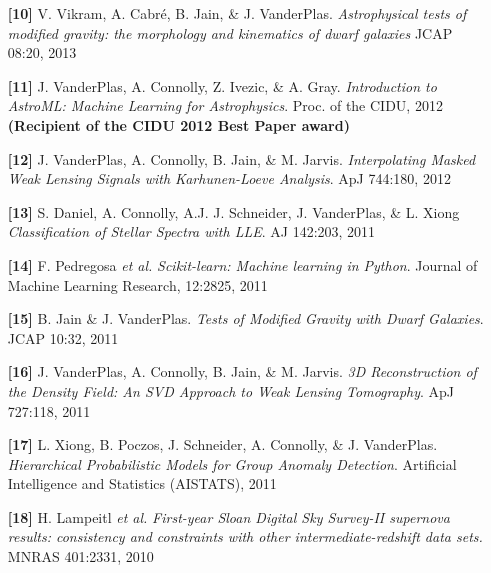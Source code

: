 \documentclass{article} %
\def\bf{\bfseries}
\def\sl{\slshape}
\begin{document}
{\begin{itemize}[leftmargin=0ex, itemsep=0ex, parsep=.5ex, labelindent=-4ex]
    \item[{\bf \textcolor{myblue}{[10]}}]
      V. Vikram, A. Cabr\'{e}, B. Jain, \& J. VanderPlas.
      {\it Astrophysical tests of modified gravity:
        the morphology and kinematics of dwarf galaxies}
      JCAP 08:20, 2013
 
    \item[{\bf \textcolor{myblue}{[11]}}]
      J. VanderPlas, A. Connolly, Z. Ivezic, \& A. Gray.
      {\sl Introduction to AstroML: Machine Learning for Astrophysics}.
      Proc. of the CIDU, 2012
      {\bf (Recipient of the CIDU 2012 Best Paper award)}

    \item[{\bf \textcolor{myblue}{[12]}}]
      J. VanderPlas, A. Connolly, B. Jain, \& M. Jarvis.
      {\it Interpolating Masked Weak Lensing Signals with Karhunen-Loeve
        Analysis}.
      ApJ 744:180, 2012

    \item[{\bf \textcolor{myblue}{[13]}}]
      S. Daniel, A. Connolly, A.J. J. Schneider, J. VanderPlas, \& L. Xiong
      {\sl Classification of Stellar Spectra with LLE}.
      AJ 142:203, 2011

    \item[{\bf \textcolor{myblue}{[14]}}]
      F. Pedregosa {\sl et al.}
      {\sl Scikit-learn: Machine learning in Python}.
      Journal of Machine Learning Research, 12:2825, 2011

    \item[{\bf \textcolor{myblue}{[15]}}]
      B. Jain \& J. VanderPlas.
      {\sl Tests of Modified Gravity with Dwarf Galaxies}.
      JCAP 10:32, 2011

    \item[{\bf \textcolor{myblue}{[16]}}]
      J. VanderPlas, A. Connolly, B. Jain, \& M. Jarvis.
      {\sl 3D Reconstruction of the Density Field: An SVD Approach
        to Weak Lensing Tomography}.
      ApJ 727:118, 2011

    \item[{\bf \textcolor{myblue}{[17]}}]
      L. Xiong, B. Poczos, J. Schneider, A. Connolly, \& J. VanderPlas.
      {\sl Hierarchical Probabilistic Models for Group Anomaly Detection}.
      Artificial Intelligence and Statistics (AISTATS), 2011

    \item[{\bf \textcolor{myblue}{[18]}}]
      H. Lampeitl {\sl et al.}
      {\sl First-year Sloan Digital Sky Survey-II supernova results: 
      consistency and constraints with other intermediate-redshift data sets.}
      MNRAS 401:2331, 2010


\end{itemize}}
\end{document}
